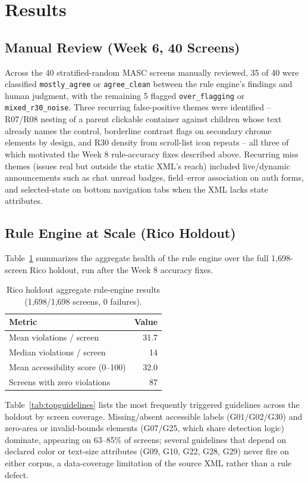 \documentclass[10pt,conference]{IEEEtran}
\begin{document}
\section{Results}

\subsection{Manual Review (Week 6, 40 Screens)}
Across the 40 stratified-random MASC screens manually reviewed, 35 of 40 were classified \texttt{mostly\_agree} or \texttt{agree\_clean} between the rule engine's findings and human judgment, with the remaining 5 flagged \texttt{over\_flagging} or \texttt{mixed\_r30\_noise}. Three recurring false-positive themes were identified -- R07/R08 nesting of a parent clickable container against children whose text already names the control, borderline contrast flags on secondary chrome elements by design, and R30 density from scroll-list icon repeats -- all three of which motivated the Week 8 rule-accuracy fixes described above. Recurring miss themes (issues real but outside the static XML's reach) included live/dynamic announcements such as chat unread badges, field--error association on auth forms, and selected-state on bottom navigation tabs when the XML lacks state attributes.

\subsection{Rule Engine at Scale (Rico Holdout)}
Table~\ref{tab:ricoagg} summarizes the aggregate health of the rule engine over the full 1{,}698-screen Rico holdout, run after the Week 8 accuracy fixes.

\begin{table}[!t]
\caption{Rico holdout aggregate rule-engine results (1,698/1,698 screens, 0 failures).}
\label{tab:ricoagg}
\centering
\scriptsize
\begin{tabular}{@{}lr@{}}
\toprule
\textbf{Metric} & \textbf{Value} \\
\midrule
Mean violations / screen & 31.7 \\
Median violations / screen & 14 \\
Mean accessibility score (0--100) & 32.0 \\
Screens with zero violations & 87 \\
\bottomrule
\end{tabular}
\end{table}

Table~\ref{tab:topguidelines} lists the most frequently triggered guidelines across the holdout by screen coverage. Missing/absent accessible labels (G01/G02/G30) and zero-area or invalid-bounds elements (G07/G25, which share detection logic) dominate, appearing on 63--85\% of screens; several guidelines that depend on declared color or text-size attributes (G09, G10, G22, G28, G29) never fire on either corpus, a data-coverage limitation of the source XML rather than a rule defect.
\end{document}
